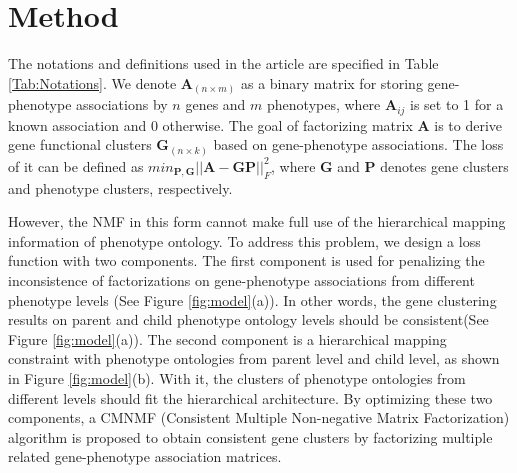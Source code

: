 \documentclass{bmcart}
\begin{document}
\section*{Method}
The notations and definitions used in the article are specified in Table \ref{Tab:Notations}. We denote $\bm{A}_{(n \times m)}$ as a binary matrix for storing gene-phenotype associations by $n$ genes and $m$ phenotypes, where $\bm{A}_{ij}$ is set to 1 for a known association and 0 otherwise. The goal of factorizing matrix $\bm{A}$ is to derive gene functional clusters $\bm{G}_{(n \times k)}$ based on gene-phenotype associations. The loss of it can be defined as $min _{\bm{P},\bm{G}} ||\bm{A}-\bm{GP}||^{2}_{F}$, where $\bm{G}$ and $\bm{P}$ denotes gene clusters and phenotype clusters, respectively.

However, the NMF in this form cannot make full use of the hierarchical mapping information of phenotype ontology. To address this problem, we design a loss function with two components. The first component is used for penalizing the inconsistence of factorizations on gene-phenotype associations from different phenotype levels (See Figure \ref{fig:model}(a)). In other words, the gene clustering results on parent and child phenotype ontology levels should be consistent(See Figure \ref{fig:model}(a)). The second component is a hierarchical mapping constraint with phenotype ontologies from parent level and child level, as shown in Figure \ref{fig:model}(b). With it, the clusters of phenotype ontologies from different levels should fit the hierarchical architecture. By optimizing these two components, a CMNMF (Consistent Multiple Non-negative Matrix Factorization) algorithm is proposed to obtain consistent gene clusters by factorizing multiple related gene-phenotype association matrices.
\end{document}
